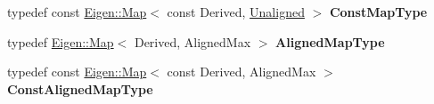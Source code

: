 \begin{DoxyCompactItemize}
\item 
\mbox{\label{class_eigen_1_1_plain_object_base_af97b8d1ff458c804698bde148f03aa88}} 
typedef const \hyperlink{group___core___module_class_eigen_1_1_map}{Eigen\+::\+Map}$<$ const Derived, \hyperlink{group__enums_gga45fe06e29902b7a2773de05ba27b47a1ac935220b4c844108e183ebe30a4d5204}{Unaligned} $>$ {\bfseries Const\+Map\+Type}
\item 
\mbox{\label{class_eigen_1_1_plain_object_base_a0cc4ed7303f5f15f28b6ef0347931618}} 
typedef \hyperlink{group___core___module_class_eigen_1_1_map}{Eigen\+::\+Map}$<$ Derived, Aligned\+Max $>$ {\bfseries Aligned\+Map\+Type}
\item 
\mbox{\label{class_eigen_1_1_plain_object_base_a495e1fa482aa3c37be8a3d2b8bb7d666}} 
typedef const \hyperlink{group___core___module_class_eigen_1_1_map}{Eigen\+::\+Map}$<$ const Derived, Aligned\+Max $>$ {\bfseries Const\+Aligned\+Map\+Type}
\end{DoxyCompactItemize}
